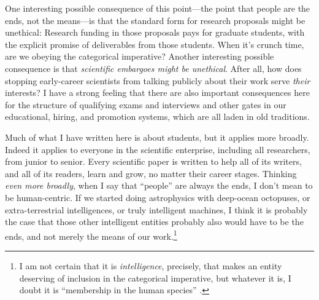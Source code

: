 \documentclass{article}
\begin{document}
One interesting possible consequence of this point---the point that people are the ends, not the means---is that the standard form for research proposals might be unethical:
Research funding in those proposals pays for graduate students, with the explicit promise of deliverables from those students.
When it's crunch time, are we obeying the categorical imperative?
Another interesting possible consequence is that \emph{scientific embargoes might be unethical}.
After all, how does stopping early-career scientists from talking publicly about their work serve \emph{their} interests?
I have a strong feeling that there are also important consequences here for the structure of qualifying exams and interviews and other gates in our educational, hiring, and promotion systems, which are all laden in old traditions.

Much of what I have written here is about students, but it applies more broadly.
Indeed it applies to everyone in the scientific enterprise,
including all researchers, from junior to senior.
Every scientific paper is written to help all of its writers, and all of its readers, learn and grow, no matter their career stages.
Thinking \emph{even more broadly}, when I say that ``people'' are always the ends, I don't mean to be human-centric.
If we started doing astrophysics with deep-ocean octopuses,
or extra-terrestrial intelligences,
or truly intelligent machines, I think it is probably the case that those other intelligent entities probably also would have to be the ends, and not merely the means of our work.\footnote{%
I am not certain that it is \emph{intelligence}, precisely, that makes an entity deserving of inclusion in the categorical imperative, but whatever it is, I doubt it is ``membership in the human species'' \cite{animallib}.}
\end{document}
